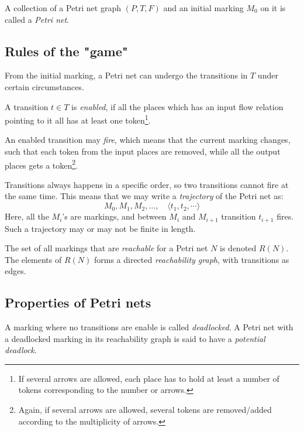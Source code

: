 \documentclass[12pt, a4paper]{article}
\numberwithin{equation}{section}
\begin{document}
A collection of a Petri net graph $(P, T, F)$ and an initial marking $M_0$ on it is called a \textit{Petri net}.

\subsection{Rules of the "game"}
From the initial marking, a Petri net can undergo the transitions in $T$ under certain circumstances.

A transition $t\in T$ is \textit{enabled}, if all the places which has an input flow relation pointing to it all has at least one token\footnote{If several arrows are allowed, each place has to hold at least a number of tokens corresponding to the number or arrows.}.

An enabled transition may \textit{fire}, which means that the current marking changes, such that each token from the input places are removed, while all the output places gets a token\footnote{Again, if several arrows are allowed, several tokens are removed/added according to the multiplicity of arrows.}.

Transitions always happens in a specific order, so two transitions cannot fire at the same time. This means that we may write a \textit{trajectory} of the Petri net as:
\begin{equation}
M_0, M_1, M_2, \ldots,\quad \langle t_1,t_2,\cdots\rangle
\end{equation}
Here, all the $M_i$'s are markings, and between $M_i$ and $M_{i+1}$ transition $t_{i+1}$ fires. Such a trajectory may or may not be finite in length.

The set of all markings that are \textit{reachable} for a Petri net $N$ is denoted $R(N)$. The elements of $R(N)$ forms a directed \textit{reachability graph}, with transitions as edges.

\subsection{Properties of Petri nets}
A marking where no transitions are enable is called \textit{deadlocked}. A Petri net with a deadlocked marking in its reachability graph is said to have a \textit{potential deadlock}.
\end{document}
